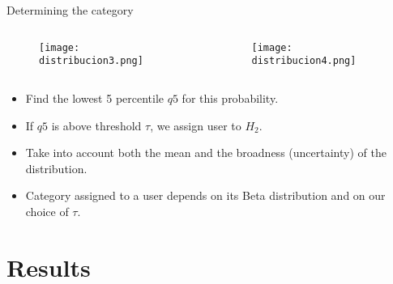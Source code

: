 \documentclass[usenames,dvipsnames]{beamer}
\begin{document}
\begin{frame}{Determining the category}

	\begin{columns}
		\begin{column}{0.49\textwidth}

\begin{figure}[h]
\begin{center}
\texttt{[image: distribucion3.png]}
\end{center}
\end{figure}
\end{column}

\begin{column}{0.49\textwidth}

\begin{figure}[h]
\begin{center}
\texttt{[image: distribucion4.png]}
\end{center}
\end{figure}

\end{column}
\end{columns}


\begin{itemize}

\item Find the lowest 5 percentile $q5$ for this probability. 

\item If $q5$ is above threshold $\tau$, we assign user to $H_2$.

\item Take into account both the mean and the broadness (uncertainty) of the distribution. 

\item Category assigned to a user depends on its Beta distribution and on our choice of $\tau$.
\end{itemize}

\end{frame}

\section{Results}
\end{document}
